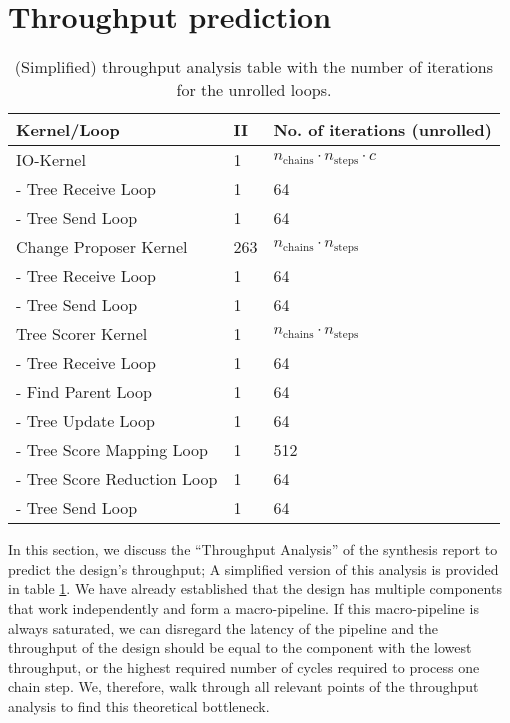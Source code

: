 \section{Throughput prediction}

\begin{table}
    \centering
    \begin{tabular}{l|l|l}
        \textbf{Kernel/Loop} & \textbf{\acs{II}} & \textbf{No. of iterations (unrolled)} \\
        \hline
        IO-Kernel & 1 & $n_\mathrm{chains} \cdot n_\mathrm{steps} \cdot c$ \\
        - Tree Receive Loop & 1 & 64 \\
        - Tree Send Loop & 1 & 64 \\
        \hline
        Change Proposer Kernel & 263 & $n_\mathrm{chains} \cdot n_\mathrm{steps}$ \\
        - Tree Receive Loop & 1 & 64 \\
        - Tree Send Loop & 1 & 64 \\
        \hline
        Tree Scorer Kernel & 1 & $n_\mathrm{chains} \cdot n_\mathrm{steps}$ \\
        - Tree Receive Loop & 1 & 64 \\
        - Find Parent Loop & 1 & 64 \\
        - Tree Update Loop & 1 & 64 \\
        - Tree Score Mapping Loop & 1 & 512 \\
        - Tree Score Reduction Loop & 1 & 64 \\
        - Tree Send Loop & 1 & 64 \\
    \end{tabular}
    \caption{(Simplified) throughput analysis table with the number of iterations for the unrolled loops.}
    \label{tab:throughput}
\end{table}

In this section, we discuss the ``Throughput Analysis'' of the synthesis report to predict the design's throughput; A simplified version of this analysis is provided in table \ref{tab:throughput}. We have already established that the design has multiple components that work independently and form a macro-pipeline. If this macro-pipeline is always saturated, we can disregard the latency of the pipeline and the throughput of the design should be equal to the component with the lowest throughput, or the highest required number of cycles required to process one chain step. We, therefore, walk through all relevant points of the throughput analysis to find this theoretical bottleneck.

